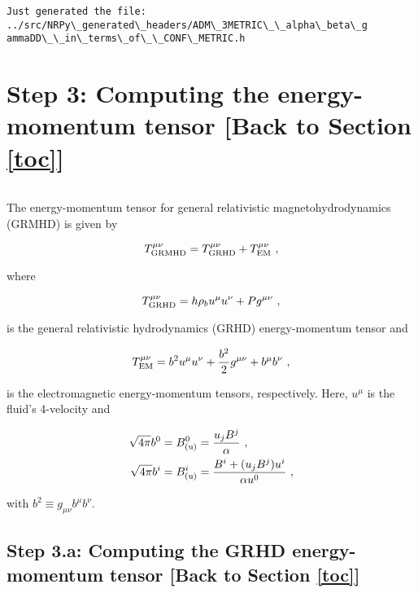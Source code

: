 \documentclass[landscape,letterpaper,10pt,english]{article}
\begin{document}
    \begin{Verbatim}[commandchars=\\\{\}]
Just generated the file: ../src/NRPy\_generated\_headers/ADM\_3METRIC\_\_alpha\_beta\_g
ammaDD\_\_in\_terms\_of\_\_CONF\_METRIC.h
    \end{Verbatim}

    \section{\texorpdfstring{Step 3: Computing the energy-momentum tensor
{[}Back to
Section \ref{toc}{]}}{Step 3: Computing the energy-momentum tensor {[}Back to {]}}}\label{step-3-computing-the-energy-momentum-tensor-back-to-top}

\[\label{tmunu}\]

The energy-momentum tensor for general relativistic magnetohydrodynamics
(GRMHD) is given by

\[
T^{\mu\nu}_{\rm GRMHD} = T^{\mu\nu}_{\rm GRHD} + T^{\mu\nu}_{\rm EM}\ ,
\]

where

\[
T^{\mu\nu}_{\rm GRHD} = h\rho_{b}u^{\mu}u^{\nu} + Pg^{\mu\nu}\ ,
\]

is the general relativistic hydrodynamics (GRHD) energy-momentum tensor
and

\[
T^{\mu\nu}_{\rm EM} = b^2 u^{\mu} u^{\nu} + \frac{b^2}{2} g^{\mu\nu} + b^\mu b^\nu\ ,
\]

is the electromagnetic energy-momentum tensors, respectively. Here,
\(u^{\mu}\) is the fluid's 4-velocity and

\begin{align}
\sqrt{4\pi} b^0 = B^0_{\rm (u)} &= \frac{u_j B^j}{\alpha}\ ,\\
\sqrt{4\pi} b^i = B^i_{\rm (u)} &= \frac{B^i + (u_j B^j) u^i}{\alpha u^0}\ ,
\end{align}

with \(b^{2}\equiv g_{\mu\nu}b^{\mu}b^{\nu}\).

    \subsection{\texorpdfstring{Step 3.a: Computing the GRHD energy-momentum
tensor {[}Back to
Section \ref{toc}{]}}{Step 3.a: Computing the GRHD energy-momentum tensor {[}Back to {]}}}\label{step-3.a-computing-the-grhd-energy-momentum-tensor-back-to-top}

\[\label{tmunu_grhd}\]

\(\newcommand{\Pcold}{P_{\text{cold}}}\)
\(\newcommand{\epscold}{\epsilon_{\text{cold}}}\)
\(\newcommand{\epsth}{\epsilon_{\text{th}}}\)
\(\newcommand{\Gammath}{\Gamma_{\text{th}}}\)
\(\newcommand{\rhob}{\rho_{b}}\)
\end{document}
